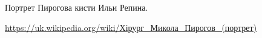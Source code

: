  
 
 
 
 


Портрет Пирогова кисти Ильи Репина.

\url{https://uk.wikipedia.org/wiki/Хірург_Микола_Пирогов_(портрет)}
